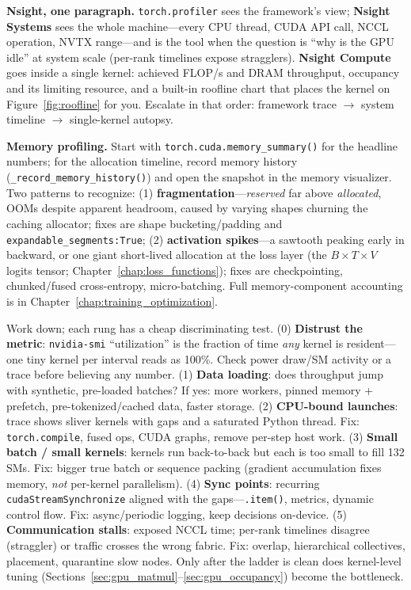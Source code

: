\textbf{Nsight, one paragraph.} \texttt{torch.profiler} sees the framework's view; \textbf{Nsight Systems} sees the whole machine---every CPU thread, CUDA API call, NCCL operation, NVTX range---and is the tool when the question is ``why is the GPU idle'' at system scale (per-rank timelines expose stragglers). \textbf{Nsight Compute} goes inside a single kernel: achieved FLOP/s and DRAM throughput, occupancy and its limiting resource, and a built-in roofline chart that places the kernel on Figure~\ref{fig:roofline} for you. Escalate in that order: framework trace $\to$ system timeline $\to$ single-kernel autopsy.

\textbf{Memory profiling.} Start with \texttt{torch.cuda.memory\_summary()} for the headline numbers; for the allocation timeline, record memory history (\texttt{\_record\_memory\_history()}) and open the snapshot in the memory visualizer. Two patterns to recognize: (1) \textbf{fragmentation}---\textit{reserved} far above \textit{allocated}, OOMs despite apparent headroom, caused by varying shapes churning the caching allocator; fixes are shape bucketing/padding and \texttt{expandable\_segments:True}; (2) \textbf{activation spikes}---a sawtooth peaking early in backward, or one giant short-lived allocation at the loss layer (the $B \times T \times V$ logits tensor; Chapter~\ref{chap:loss_functions}); fixes are checkpointing, chunked/fused cross-entropy, micro-batching. Full memory-component accounting is in Chapter~\ref{chap:training_optimization}.

\begin{keyinsight}
Work down; each rung has a cheap discriminating test. (0) \textbf{Distrust the metric}: \texttt{nvidia-smi} ``utilization'' is the fraction of time \textit{any} kernel is resident---one tiny kernel per interval reads as 100\%. Check power draw/SM activity or a trace before believing any number. (1) \textbf{Data loading}: does throughput jump with synthetic, pre-loaded batches? If yes: more workers, pinned memory + prefetch, pre-tokenized/cached data, faster storage. (2) \textbf{CPU-bound launches}: trace shows sliver kernels with gaps and a saturated Python thread. Fix: \texttt{torch.compile}, fused ops, CUDA graphs, remove per-step host work. (3) \textbf{Small batch / small kernels}: kernels run back-to-back but each is too small to fill 132 SMs. Fix: bigger true batch or sequence packing (gradient accumulation fixes memory, \textit{not} per-kernel parallelism). (4) \textbf{Sync points}: recurring \texttt{cudaStreamSynchronize} aligned with the gaps---\texttt{.item()}, metrics, dynamic control flow. Fix: async/periodic logging, keep decisions on-device. (5) \textbf{Communication stalls}: exposed NCCL time; per-rank timelines disagree (straggler) or traffic crosses the wrong fabric. Fix: overlap, hierarchical collectives, placement, quarantine slow nodes. Only after the ladder is clean does kernel-level tuning (Sections~\ref{sec:gpu_matmul}--\ref{sec:gpu_occupancy}) become the bottleneck.
\end{keyinsight}

